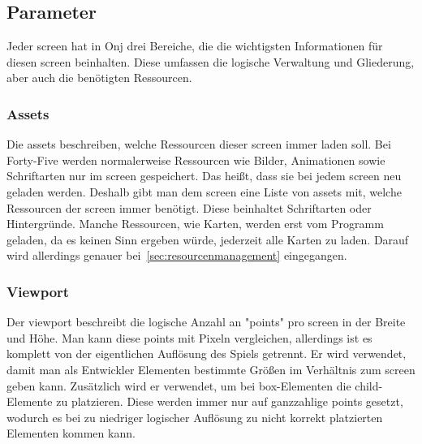\renewcommand{\kapitelautor}{Autor: Felix Zwickelstorfer}
\subsection{Parameter}\label{subsec:parameter}
\renewcommand{\kapitelautor}{Autor: Felix Zwickelstorfer}

Jeder screen hat in Onj drei Bereiche, die die wichtigsten Informationen für diesen screen beinhalten. 
Diese umfassen die logische Verwaltung und Gliederung, aber auch die benötigten Ressourcen.

\renewcommand{\kapitelautor}{Autor: Felix Zwickelstorfer}
\subsubsection{Assets}\label{subsubsec:assets}
\renewcommand{\kapitelautor}{Autor: Felix Zwickelstorfer}
Die assets beschreiben, welche Ressourcen dieser screen immer laden soll. 
Bei Forty-Five werden normalerweise Ressourcen wie Bilder, Animationen sowie Schriftarten nur im screen gespeichert. 
Das heißt, dass sie bei jedem screen neu geladen werden. 
Deshalb gibt man dem screen eine Liste von assets mit, welche Ressourcen der screen immer benötigt. 
Diese beinhaltet \zB Schriftarten oder Hintergründe. 
Manche Ressourcen, wie \zB Karten, werden erst vom Programm geladen, da es keinen Sinn ergeben würde, jederzeit alle Karten zu laden. 
Darauf wird allerdings genauer bei~\ref{sec:resourcenmanagement} eingegangen.

\renewcommand{\kapitelautor}{Autor: Felix Zwickelstorfer}
\subsubsection{Viewport}\label{subsubsec:viewport}
\renewcommand{\kapitelautor}{Autor: Felix Zwickelstorfer}
Der viewport beschreibt die logische Anzahl an "points" pro screen in der Breite und Höhe. 
Man kann diese points mit Pixeln vergleichen, allerdings ist es komplett von der eigentlichen Auflösung des Spiels getrennt. 
Er wird verwendet, damit man als Entwickler Elementen bestimmte Größen im Verhältnis zum screen geben kann. 
Zusätzlich wird er verwendet, um bei box-Elementen die child-Elemente zu platzieren.
Diese werden immer nur auf ganzzahlige points gesetzt, wodurch es bei zu niedriger logischer Auflösung zu nicht korrekt platzierten Elementen kommen kann.

\renewcommand{\kapitelautor}{Autor: Felix Zwickelstorfer}
